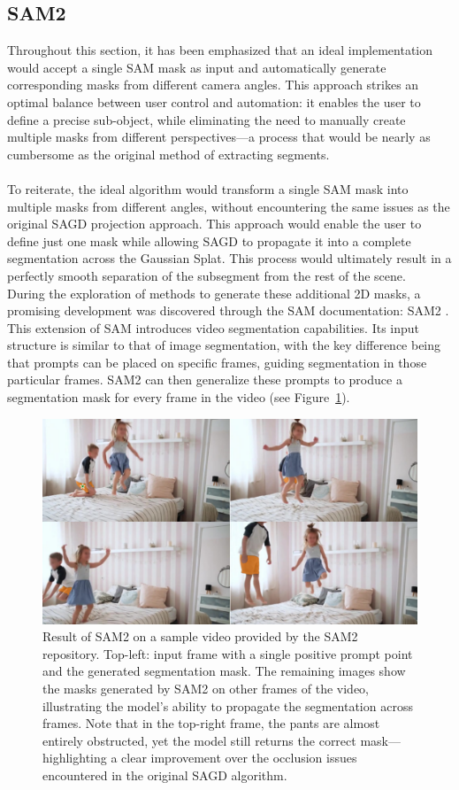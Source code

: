\documentclass[12pt]{article}
\begin{document}
\subsection{SAM2}
Throughout this section, it has been emphasized that an ideal implementation would accept a single SAM mask as input and automatically generate corresponding masks from different camera angles. This approach strikes an optimal balance between user control and automation: it enables the user to define a precise sub-object, while eliminating the need to manually create multiple masks from different perspectives—a process that would be nearly as cumbersome as the original method of extracting segments.
\\\\
To reiterate, the ideal algorithm would transform a single SAM mask into multiple masks from different angles, without encountering the same issues as the original SAGD projection approach. This approach would enable the user to define just one mask while allowing SAGD to propagate it into a complete segmentation across the Gaussian Splat. This process would ultimately result in a perfectly smooth separation of the subsegment from the rest of the scene.\\
During the exploration of methods to generate these additional 2D masks, a promising development was discovered through the SAM documentation: SAM2 \cite{SAM2}. This extension of SAM introduces video segmentation capabilities. Its input structure is similar to that of image segmentation, with the key difference being that prompts can be placed on specific frames, guiding segmentation in those particular frames. SAM2 can then generalize these prompts to produce a segmentation mask for every frame in the video (see Figure~\ref{fig:children}).
\begin{figure}[h!]
	\centering
	\includegraphics[width=\textwidth]{Images/children.png}
	\caption{Result of SAM2 on a sample video provided by the SAM2 repository. Top-left: input frame with a single positive prompt point and the generated segmentation mask. The remaining images show the masks generated by SAM2 on other frames of the video, illustrating the model's ability to propagate the segmentation across frames. Note that in the top-right frame, the pants are almost entirely obstructed, yet the model still returns the correct mask—highlighting a clear improvement over the occlusion issues encountered in the original SAGD algorithm.}
	\label{fig:children}
\end{figure}
\end{document}
